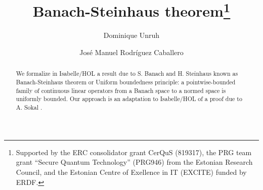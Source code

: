 \documentclass[11pt,a4paper]{article}
\begin{document}
\title{Banach-Steinhaus theorem\thanks{Supported by the ERC consolidator grant CerQuS (819317), the PRG team grant “Secure Quantum Technology” (PRG946) from the Estonian Research Council, and the Estonian Centre of Exellence in IT (EXCITE) funded by ERDF.}}
\author{Dominique Unruh \and Jos\'e Manuel Rodr\'iguez Caballero}
\maketitle

\begin{abstract}
We formalize in Isabelle/HOL a result \cite{Weisstein_UBP} due to S. Banach and H. Steinhaus \cite{banach1927principe} known as Banach-Steinhaus theorem or Uniform boundedness principle: a pointwise-bounded family of continuous linear operators from a Banach space to a normed space is uniformly bounded. Our approach is an adaptation to Isabelle/HOL of a proof due to A. Sokal \cite{sokal2011really}.
\end{abstract}

\tableofcontents






\end{document}
